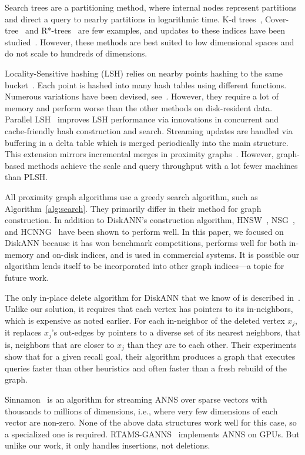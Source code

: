 Search trees are a partitioning method, where internal nodes
represent partitions and direct a query to nearby
partitions in logarithmic time.
K-d trees~, Cover-tree~\cite{Beygelzimer06} and R*-trees~\cite{Beckmann90} 
are few examples, and updates to these indices have been  studied~\cite{dobson2021parallelnearestneighborslow}.
However, these methods are best suited to low dimensional spaces
and do not scale to hundreds of dimensions.

Locality-Sensitive hashing (LSH) relies on nearby points hashing to the same bucket~\cite{Indyk98}.
Each point is hashed into many hash tables using different functions.
Numerous variations have been devised, see~\cite{LSHSurvey08}.
However, they require a lot of memory and perform worse than the other methods on disk-resident data.
Parallel LSH~\cite{PLSH13} improves LSH performance via innovations in
concurrent and cache-friendly hash construction and search. 
Streaming updates are handled via buffering in a delta table
which is merged periodically into the main structure.
This extension mirrors incremental merges in proximity graphs~\cite{freshdiskann}.
However, graph-based methods achieve the scale and query throughput with a lot fewer machines than PLSH.



All proximity graph algorithms use a greedy search algorithm, such as Algorithm~\ref{alg:search}.
They primarily differ in their method for graph construction.
In addition to DiskANN's construction algorithm, HNSW~\cite{HNSW16}, NSG~\cite{NSG17}, and HCNNG~\cite{MunozGDT19} have been shown to perform well. 
In this paper, we focused on DiskANN because it has won benchmark competitions,
performs well for both in-memory and on-disk indices, and is used in commercial systems.
It is possible our algorithm lends itself to be incorporated into other graph indices---a topic for future work.

The only in-place delete algorithm for DiskANN that we know of is described in~\cite{ZhaozhuXuEtAl22}.
Unlike our solution, it requires that each vertex has pointers to its in-neighbors, which is expensive as noted earlier.
For each in-neighbor of the deleted vertex $x_j$, it replaces $x_j$'s out-edges by pointers to a diverse set of its nearest neighbors, that is, neighbors that are closer to $x_j$ than they are to each other.
Their experiments show that for a given recall goal, their algorithm produces a graph that executes queries faster than other heuristics and often faster than a fresh rebuild of the graph.

Sinnamon~\cite{BruchNIL24} is an algorithm for streaming ANNS over sparse vectors with thousands to millions of dimensions, i.e., where very few dimensions of each vector are non-zero.
None of the above data structures work well for this case, so a specialized one is required.
RTAMS-GANNS~\cite{YipingSunEtAl24} implements ANNS on GPUs.
But unlike our work, it only handles insertions, not deletions.